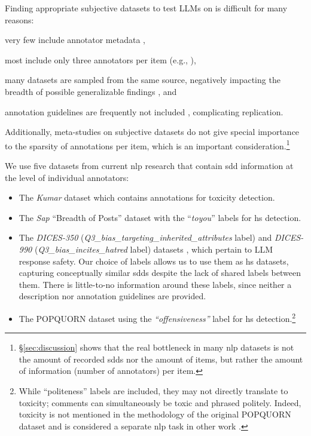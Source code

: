 \documentclass[manuscript,screen,review,anonymous]{acmart}
\theoremstyle{acmplain}
\theoremstyle{researchquestionstyle}
\begin{document}
Finding appropriate subjective datasets to test LLMs on is difficult for many reasons:
\begin{enumerate*}
	\item very few include annotator metadata \citep{vitsakis-etal-2024-voices},
	\item most include only three annotators per item (e.g., ),
	\item many datasets are sampled from the same source, negatively impacting the breadth of possible generalizable findings \citep{vidgen_2021_directions}, and
	\item annotation guidelines are frequently not included \citep{vidgen_2021_directions}, complicating replication.
\end{enumerate*} 
Additionally, meta-studies on subjective datasets \citep{Poletto2021, vidgen_2021_directions} do not give special importance to the sparsity of annotations per item, which is an important consideration.\footnote{\S\ref{sec:discussion} shows that the real bottleneck in many \ac{nlp} datasets is not the amount of recorded \acp{sdd} nor the amount of items, but rather the amount of information (number of annotators) per item.}

We use five datasets from current \ac{nlp} research that contain \ac{sdd} information at the level of individual annotators:
\begin{itemize}
	\item The \textit{Kumar} dataset \citep{kumar-et-al-2021} which contains annotations for toxicity detection.
	\item The \textit{Sap} ``Breadth of Posts'' dataset with the ``\textit{toyou}'' labels \citep{sap-etal-2022-annotators} for \ac{hs} detection.
	\item The \textit{DICES-350} (\textit{Q3\_bias\_targeting\_inherited\_attributes} label) and \textit{DICES-990} (\textit{Q3\_bias\_incites\_hatred} label) datasets \citep{dices}, which pertain to LLM response safety. Our choice of labels allows us to use them as \ac{hs} datasets, capturing conceptually similar \acp{sdd} despite the lack of shared labels between them. There is little-to-no information around these labels, since neither a description nor annotation guidelines are provided.
	\item The POPQUORN \citep{pei-jurgens-2023-annotator} dataset using the \textit{``offensiveness''} label for \ac{hs} detection.\footnote{While ``politeness'' labels are included, they may not directly translate to toxicity; comments can simultaneously be toxic and phrased politely. Indeed, toxicity is not mentioned in the methodology of the original POPQUORN dataset and is considered a separate \ac{nlp} task in other work \citep{ziems2024can, lukito-etal-2024-comparing}.}
\end{itemize}
\end{document}

